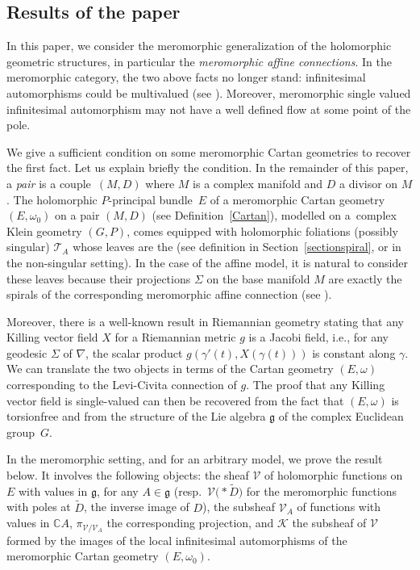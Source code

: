 \documentclass[10pt,a4paper]{amsart}
\numberwithin{equation}{section}
\begin{document}
\subsection{Results of the paper}
In this paper, we consider the meromorphic generalization of the holomorphic geometric structures, in particular the \textit{meromorphic affine connections}. In the meromorphic category, the two above facts no longer stand: infinitesimal automorphisms could be multivalued (see \cite[Example~3.8]{BlazquezCasale}). Moreover, meromorphic single valued infinitesimal automorphism may not have a well defined flow at some point of the pole.

 We give a sufficient condition on some meromorphic Cartan geometries to recover the first fact. Let us explain briefly the condition. In the remainder of this paper, a \textit{pair} is a couple~$(M,D)$ where $M$ is a complex manifold and $D$ a divisor on $M$. The holomorphic $P$-principal bundle~$E$ of a meromorphic Cartan geometry $(E,\omega_0)$ on a pair $(M,D)$ (see Definition~\ref{Cartan}), modelled on a~complex Klein geometry $(G,P)$, comes equipped with holomorphic foliations (possibly singular) $\mathcal{T}_A$ whose leaves are the  (see definition in Section~\ref{sectionspiral}, or \cite[Definition~4.16]{Sharpe} in the non-singular setting). In the case of the affine model, it is natural to consider these leaves because their projections $\Sigma$ on the base manifold $M$ are exactly the spirals of the corresponding meromorphic affine connection (see \cite[p.~344]{Sharpe}).

 Moreover, there is a well-known result in Riemannian geometry stating that any Killing vector field $X$ for a Riemannian metric $g$ is a Jacobi field, i.e., for any geodesic $\Sigma$ of $\nabla$, the scalar product $g(\gamma'(t),X(\gamma(t)))$ is constant along $\gamma$. We can translate the two objects in terms of the Cartan geometry $(E,\omega)$ corresponding to the Levi-Civita connection of $g$. The proof that any Killing vector field is single-valued can then be recovered from the fact that $(E,\omega)$ is torsionfree and from the structure of the Lie algebra $\mathfrak{g}$ of the complex Euclidean group~$G$.

In the meromorphic setting, and for an arbitrary model, we prove the result below. It involves the following objects: the sheaf $\mathcal{V}$ of holomorphic functions on $E$ with values in $\mathfrak{g}$, for any $A\in \mathfrak{g}$ (resp.\ $\mathcal{V}\bigl(*\tilde{D}\bigr)$ for the meromorphic functions with poles at $\tilde{D}$, the inverse image of $D$), the subsheaf $\mathcal{V}_A$ of functions with values in $\mathbb{C}A$, $\pi_{\mathcal{V}/\mathcal{V}_A}$ the corresponding projection, and $\mathcal{K}$ the subsheaf of $\mathcal{V}$ formed by the images of the local infinitesimal automorphisms of the meromorphic Cartan geometry $(E,\omega_0)$.
\end{document}
